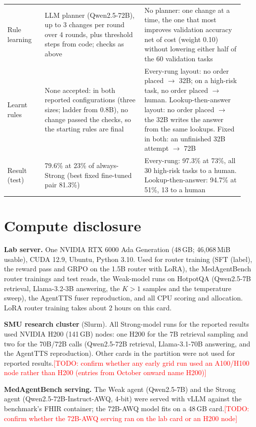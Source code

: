 \documentclass{article}
\newif\ifshowtodos \showtodostrue
\newcommand{\todo}[1]{\ifshowtodos\textcolor{red}{\textsf{\small[TODO: #1]}}\fi}
\begin{document}
\begin{table}[!htb]
\begin{tabular}{@{}p{0.15\linewidth}p{0.40\linewidth}p{0.40\linewidth}@{}}
Rule learning & LLM planner (Qwen2.5-72B), up to 3 changes per round over 4 rounds, plus threshold steps from code; checks as above & No planner: one change at a time, the one that most improves validation accuracy net of cost (weight 0.10) without lowering either half of the 60 validation tasks \\
Learnt rules & None accepted: in both reported configurations (three sizes; ladder from 0.8B), no change passed the checks, so the starting rules are final & Every-rung layout: no order placed $\to$ 32B; on a high-risk task, no order placed $\to$ human. Lookup-then-answer layout: no order placed $\to$ the 32B writes the answer from the same lookups. Fixed in both: an unfinished 32B attempt $\to$ 72B \\
Result (test) & 79.6\% at 23\% of always-Strong (best fixed fine-tuned pair 81.3\%) & Every-rung: 97.3\% at 73\%, all 30 high-risk tasks to a human. Lookup-then-answer: 94.7\% at 51\%, 13 to a human \\
\bottomrule
\end{tabular}
\end{table}

\section{Compute disclosure}
\label{app:compute}
\textbf{Lab server.} One NVIDIA RTX 6000 Ada Generation (48\,GB; 46,068\,MiB usable), CUDA 12.9, Ubuntu, Python 3.10. Used for router training (SFT (label), the reward pass and GRPO on the 1.5B router with LoRA), the MedAgentBench router trainings and test reads, the Weak-model runs on HotpotQA (Qwen2.5-7B retrieval, Llama-3.2-3B answering, the $K{>}1$ samples and the temperature sweep), the AgentTTS fuser reproduction, and all CPU scoring and allocation. LoRA router training takes about 2 hours on this card.

\textbf{SMU research cluster} (Slurm). All Strong-model runs for the reported results used NVIDIA H200 (141\,GB) nodes: one H200 for the 7B retrieval sampling and two for the 70B/72B calls (Qwen2.5-72B retrieval, Llama-3.1-70B answering, and the AgentTTS reproduction). Other cards in the partition were not used for reported results.\todo{confirm whether any early grid run used an A100/H100 node rather than H200 (entries from October onward name H200)}

\textbf{MedAgentBench serving.} The Weak agent (Qwen2.5-7B) and the Strong agent (Qwen2.5-72B-Instruct-AWQ, 4-bit) were served with vLLM against the benchmark's FHIR container; the 72B-AWQ model fits on a 48\,GB card.\todo{confirm whether the 72B-AWQ serving ran on the lab card or an H200 node}
\end{document}
